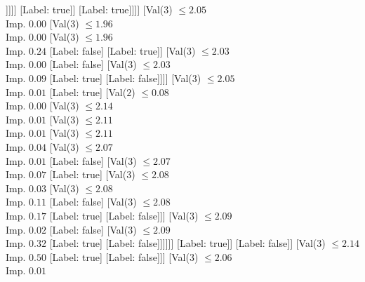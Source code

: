 \documentclass[margin=10pt]{standalone}
\begin{document}
\begin{forest}
														[Label: true]
														[Val($3$) $ \leq 1.93$ \\ Imp. $0.05$
															[Label: false]
															[Val($3$) $ \leq 1.93$ \\ Imp. $0.44$
																[Label: true]
																[Label: false]]]]]
												[Label: true]]
											[Label: true]]]]
								[Val($3$) $ \leq 2.05$ \\ Imp. $0.00$
									[Val($3$) $ \leq 1.96$ \\ Imp. $0.00$
										[Val($3$) $ \leq 1.96$ \\ Imp. $0.24$
											[Label: false]
											[Label: true]]
										[Val($3$) $ \leq 2.03$ \\ Imp. $0.00$
											[Label: false]
											[Val($3$) $ \leq 2.03$ \\ Imp. $0.09$
												[Label: true]
												[Label: false]]]]
									[Val($3$) $ \leq 2.05$ \\ Imp. $0.01$
										[Label: true]
										[Val($2$) $ \leq 0.08$ \\ Imp. $0.00$
											[Val($3$) $ \leq 2.14$ \\ Imp. $0.01$
												[Val($3$) $ \leq 2.11$ \\ Imp. $0.01$
													[Val($3$) $ \leq 2.11$ \\ Imp. $0.04$
														[Val($3$) $ \leq 2.07$ \\ Imp. $0.01$
															[Label: false]
															[Val($3$) $ \leq 2.07$ \\ Imp. $0.07$
																[Label: true]
																[Val($3$) $ \leq 2.08$ \\ Imp. $0.03$
																	[Val($3$) $ \leq 2.08$ \\ Imp. $0.11$
																		[Label: false]
																		[Val($3$) $ \leq 2.08$ \\ Imp. $0.17$
																			[Label: true]
																			[Label: false]]]
																	[Val($3$) $ \leq 2.09$ \\ Imp. $0.02$
																		[Label: false]
																		[Val($3$) $ \leq 2.09$ \\ Imp. $0.32$
																			[Label: true]
																			[Label: false]]]]]]
														[Label: true]]
													[Label: false]]
												[Val($3$) $ \leq 2.14$ \\ Imp. $0.50$
													[Label: true]
													[Label: false]]]
											[Val($3$) $ \leq 2.06$ \\ Imp. $0.01$

\end{forest}
\end{document}
